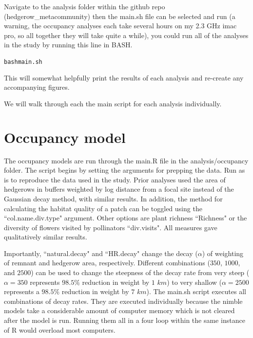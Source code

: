 \documentclass{article}\usepackage[]{graphicx}\usepackage[]{color}
\makeatletter
\newenvironment{kframe}{%
 \def\at@end@of@kframe{}%
 \ifinner\ifhmode%
  \def\at@end@of@kframe{\end{minipage}}%
  \begin{minipage}{\columnwidth}%
 \fi\fi%
 \def\FrameCommand##1{\hskip\@totalleftmargin \hskip-\fboxsep
 \colorbox{shadecolor}{##1}\hskip-\fboxsep
     \hskip-\linewidth \hskip-\@totalleftmargin \hskip\columnwidth}%
 \MakeFramed {\advance\hsize-\width
   \@totalleftmargin\z@ \linewidth\hsize
   \@setminipage}}%
 {\par\unskip\endMakeFramed%
 \at@end@of@kframe}
\newenvironment{knitrout}{}{} %
\makeatother
\begin{document}
Navigate to the analysis folder within the github repo
(hedgerow\_metacommunity) then the main.sh file can be selected and
run (a warning, the occupancy analyses each take several hours on my
2.3 GHz imac pro, so all together they will take quite a while), you
could run all of the analyses in the study by running this line in
BASH.

\begin{knitrout}
\color{fgcolor}\begin{kframe}
\begin{alltt}
bash main.sh
\end{alltt}
\end{kframe}
\end{knitrout}

This will somewhat helpfully print the results of each analysis
and re-create any accompanying figures.

We will walk through each the main script for each analysis
individually.

\section{Occupancy model}

The occupancy models are run through the main.R file in the
analysis/occupancy folder. The script begins by setting the arguments
for prepping the data. Run as is to reproduce the data used in the
study. Prior analyses used the area of hedgerows in buffers weighted
by log distance from a focal site instead of the Gaussian decay
method, with similar results. In addition, the method for calculating
the habitat quality of a patch can be toggled using the ``col.name.div.type" argument. Other options are plant richness
``Richness" or the diversity of flowers visited by pollinators
``div.visits". All measures gave qualitatively similar results.

Importantly, ``natural.decay" and ``HR.decay" change the decay
($\alpha$) of weighting of remnant and hedgerow area,
respectively. Different combinations ($350$, $1000$, and $2500$) can
be used to change the steepness of the decay rate from very steep
($\alpha=350$ represents $98.5\%$ reduction in weight by $1$ $km$) to
very shallow ($\alpha=2500$ represents a $98.5\%$ reduction in weight
by $7$ $km$). The main.sh script executes all combinations of decay
rates. They are executed individually because the nimble models take a
considerable amount of computer memory which is not cleared after the
model is run. Running them all in a four loop within the same instance
of R would overload most computers.
\end{document}
